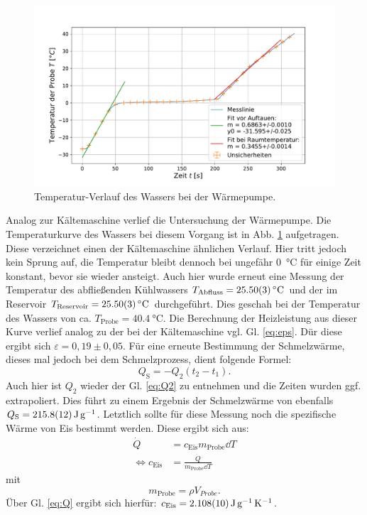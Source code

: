 	\begin{figure}[ht]
		\centering
		\includegraphics[width=\textwidth]{data/warm_machen.pdf}
		\caption{Temperatur-Verlauf des Wassers bei der Wärmepumpe.}
		\label{fig:Wärmepumpe}	
	\end{figure}
	Analog zur Kältemaschine verlief die Untersuchung der Wärmepumpe. 
	Die Temperaturkurve des Wassers bei diesem Vorgang ist in Abb. \ref{fig:Wärmepumpe} aufgetragen.
	Diese verzeichnet einen der Kältemaschine ähnlichen Verlauf.
	Hier tritt jedoch kein Sprung auf, die Temperatur bleibt dennoch bei ungefähr \SI{0}{\celsius} für einige Zeit konstant, bevor sie wieder ansteigt.
	Auch hier wurde erneut eine Messung der Temperatur des abfließenden Kühlwassers $T_\text{Abfluss} = \SI{25,5+-0,03}{\celsius}$ und der im Reservoir $T_\text{Reservoir} = \SI{25,5+-0,03}{\celsius}$ durchgeführt.
	Dies geschah bei der Temperatur des Wassers von ca. $T_\text{Probe} = \SI{40,4}{\celsius}$.
	Die Berechnung der Heizleistung aus dieser Kurve verlief analog zu der bei der Kältemaschine vgl. Gl. \ref{eq:eps}.
	Dür diese ergibt sich $\varepsilon = 0,19\pm 0,05$.
	Für eine erneute Bestimmung der Schmelzwärme, dieses mal jedoch bei dem Schmelzprozess, dient folgende Formel:
	\begin{equation} %
		Q_\text{S} = -Q_2 (t_2 - t_1).
	\end{equation} %
	Auch hier ist $Q_2$ wieder der Gl. \ref{eq:Q2} zu entnehmen und die Zeiten wurden ggf. extrapoliert.
	Dies führt zu einem Ergebnis der Schmelzwärme von ebenfalls $Q_\text{S} = \SI{215.8+-1.2}{\joule\per\gram}$.
	Letztlich sollte für diese Messung noch die spezifische Wärme von Eis bestimmt werden.
	Diese ergibt sich aus:
	\begin{align}
		\dot{Q} &= c_\text{Eis} m_\text{Probe} \dd T\\
		\Leftrightarrow c_\text{Eis} &= \frac{\dot{Q}}{m_\text{Probe}\dd T}
	\end{align} %
	mit
	\begin{equation}
		m_\text{Probe} = \rho V_{Probe}.
	\end{equation} %
	Über Gl. \ref{eq:Q} ergibt sich hierfür: $c_\text{Eis}=\SI{2.108+-0.010}{\joule\per\gram\per\kelvin}$.
	
